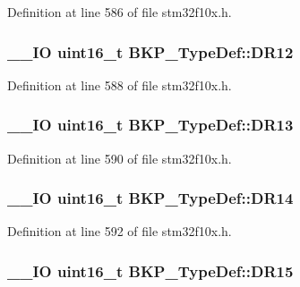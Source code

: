 Definition at line 586 of file stm32f10x.\-h.

\hypertarget{struct_b_k_p___type_def_ab41da40ac09242ce3e9779e1634048be}{
\subsubsection[{D\-R12}]{\setlength{\rightskip}{0pt plus 5cm}\-\_\-\-\_\-\-I\-O {\bf uint16\-\_\-t} B\-K\-P\-\_\-\-Type\-Def\-::\-D\-R12}}\label{struct_b_k_p___type_def_ab41da40ac09242ce3e9779e1634048be}


Definition at line 588 of file stm32f10x.\-h.

\hypertarget{struct_b_k_p___type_def_a0ab16642a837425a410058ce4295b208}{
\subsubsection[{D\-R13}]{\setlength{\rightskip}{0pt plus 5cm}\-\_\-\-\_\-\-I\-O {\bf uint16\-\_\-t} B\-K\-P\-\_\-\-Type\-Def\-::\-D\-R13}}\label{struct_b_k_p___type_def_a0ab16642a837425a410058ce4295b208}


Definition at line 590 of file stm32f10x.\-h.

\hypertarget{struct_b_k_p___type_def_aa925753417b767820db2ff1fa87d0c86}{
\subsubsection[{D\-R14}]{\setlength{\rightskip}{0pt plus 5cm}\-\_\-\-\_\-\-I\-O {\bf uint16\-\_\-t} B\-K\-P\-\_\-\-Type\-Def\-::\-D\-R14}}\label{struct_b_k_p___type_def_aa925753417b767820db2ff1fa87d0c86}


Definition at line 592 of file stm32f10x.\-h.

\hypertarget{struct_b_k_p___type_def_accafac1f65c5eb8f63d5a98ee8173ab3}{
\subsubsection[{D\-R15}]{\setlength{\rightskip}{0pt plus 5cm}\-\_\-\-\_\-\-I\-O {\bf uint16\-\_\-t} B\-K\-P\-\_\-\-Type\-Def\-::\-D\-R15}}\label{struct_b_k_p___type_def_accafac1f65c5eb8f63d5a98ee8173ab3}


